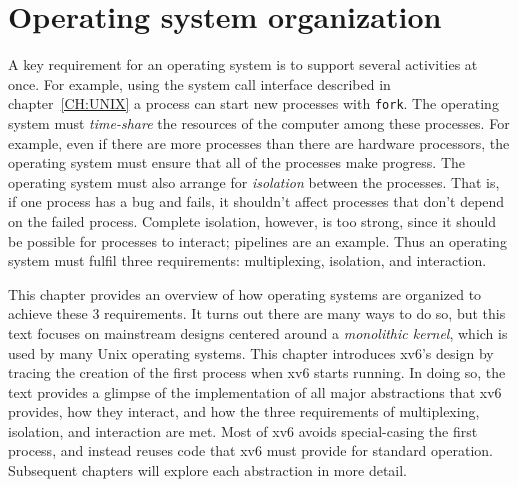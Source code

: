 
\chapter{Operating system organization}
\label{CH:FIRST}

A key requirement for an operating system is to support several activities at once.  For
example, using the system call interface described in
chapter~\ref{CH:UNIX}
a process can start new processes with 
\lstinline{fork}.
The operating system must 
\textit{time-share} 
the resources of the computer among these processes.
For example, even if there are more processes
than there are hardware processors, the operating
system must ensure that all of the processes
make progress.  The operating system must also arrange for
\textit{isolation} 
between the processes.
That is, if one process has a bug and fails, it shouldn't affect processes that
don't depend on the failed process.
Complete isolation, however, is too strong, since it should be possible for
processes to interact; pipelines are an example.
Thus
an operating system must fulfil three requirements: multiplexing, isolation,
and interaction.

This chapter provides an overview of how operating systems are organized to achieve
these 3 requirements.  It turns out there are many ways to do so, but this text
focuses on mainstream designs centered around a 
\textit{monolithic kernel}, 
which is used by many Unix operating systems.  This chapter 
introduces xv6's design by
tracing the creation of the first process when xv6 starts
running.  In doing so, the text provides a glimpse of the implementation of all
major abstractions that xv6 provides, how they interact, and how the three
requirements of multiplexing, isolation, and interaction are met.  Most of xv6
avoids special-casing the first process, and instead reuses code that xv6 must
provide for standard operation.  Subsequent chapters will explore each
abstraction in more detail.

